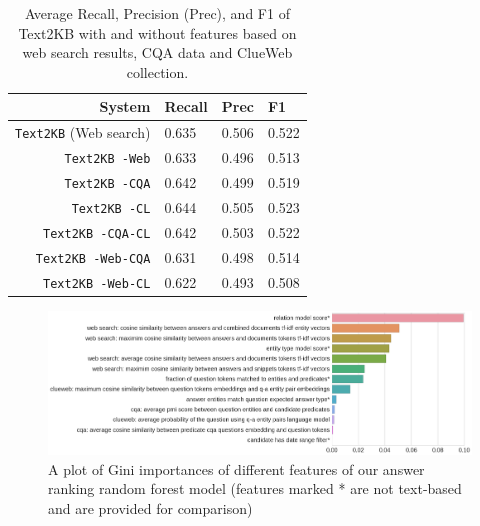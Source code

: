 \begin{table}[h]
\centering
\begin{tabular}{rlll}
System & Recall & Prec &  F1 \\
\hline
\texttt{Text2KB} (Web search) & 0.635 & 0.506 & 0.522 \\
\hline
\texttt{Text2KB -Web} & 0.633 & 0.496 & 0.513 \\
\texttt{Text2KB -CQA} & 0.642 & 0.499 & 0.519 \\
\texttt{Text2KB -CL} & 0.644 & 0.505 & 0.523 \\
\hline
\texttt{Text2KB -CQA-CL} & 0.642 & 0.503 & 0.522 \\
\texttt{Text2KB -Web-CQA} & 0.631 & 0.498 & 0.514 \\
\texttt{Text2KB -Web-CL} & 0.622 & 0.493 & 0.508 \\
\end{tabular}
\caption{Average Recall, Precision (Prec), and F1 of Text2KB with and without features based on web search results, CQA data and ClueWeb collection.}
\label{table:factoid:text2kb:ablation:features}
\end{table}

\begin{figure}
\centering
\includegraphics[width=\textwidth]{img/feature_importances}
\caption{A plot of Gini importances of different features of our answer ranking random forest model (features marked * are not text-based and are provided for comparison)}
\label{figure:factoid:text2kb:ablation:feature_importances}
\end{figure}

